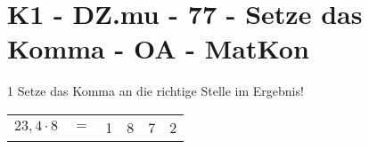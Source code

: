 \section{K1 - DZ.mu - 77 - Setze das Komma - OA - MatKon}

\begin{langesbeispiel}\item[1] %
Setze das Komma an die richtige Stelle im Ergebnis!

\begin{tabular}{rccccc}
$23,4\cdot 8$&$=$&1&8&7\antwort{\, ,}&2
\end{tabular}

\end{langesbeispiel}